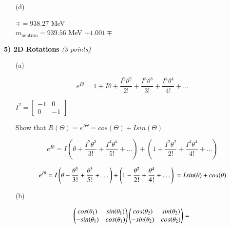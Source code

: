 {\begin{itemize}
\item[(d)]{
$\mp = 938.27$ MeV\\
$m_{\text{neutron}} = 939.56$ MeV $ \sim 1.001 \mp $

}
\end{itemize}

\vspace*{0.25in}

\newpage

\textbf{5) 2D Rotations } \hfill \textit{(3 points)}
\begin{itemize}
\item[(a)]{

\begin{equation*}
e^{I\theta} = 1 + I\theta + \frac{I^2\theta^2}{2!} + \frac{I^3\theta^3}{3!} + \frac{I^4\theta^4}{4!} + \dots
\end{equation*}

$I^2 = \begin{bmatrix} -1 & 0  \\ 0 & -1 \end{bmatrix} $

Show that $R(\Theta) = e^{I\Theta} = cos(\Theta)+ I sin(\Theta)$


\begin{equation*}
e^{I\theta} = I\left(\theta + \frac{I^2\theta^3}{3!} + \frac{I^4\theta^5}{5!} + \dots \right) + \left(1 + \frac{I^2\theta^2}{2!} + \frac{I^4\theta^4}{4!}  + \dots \right)
\end{equation*}

\begin{equation*}
e^{I\theta} = I\left(\theta - \frac{\theta^3}{3!} + \frac{\theta^5}{5!} + \dots \right) + \left(1 - \frac{\theta^2}{2!} + \frac{\theta^4}{4!}  + \dots \right) \\
= I sin(\theta) + cos(\theta)
\end{equation*}

  
}
\item[(b)]{

\begin{equation*}
\begin{pmatrix}  cos(\theta_1) & sin(\theta_1) \\ -sin(\theta_1) & cos(\theta_1) \end{pmatrix} 
\begin{pmatrix}  cos(\theta_2) & sin(\theta_2) \\ -sin(\theta_2) & cos(\theta_2) \end{pmatrix}  = \\
\end{equation*}

}
\end{itemize}}
